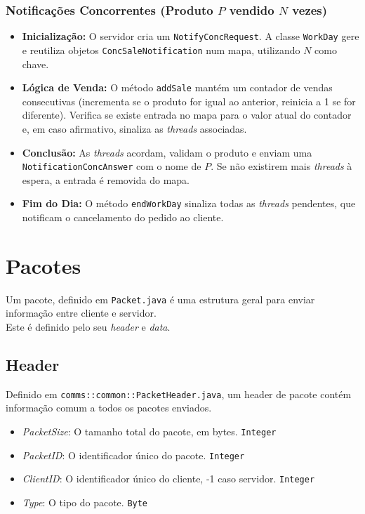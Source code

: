 \documentclass[runningheads]{llncs}
\begin{document}
\subsubsection{Notificações Concorrentes (Produto $P$ vendido $N$ vezes)}

\begin{itemize}
    \item \textbf{Inicialização:} O servidor cria um \texttt{NotifyConcRequest}. A classe \texttt{WorkDay} gere e reutiliza objetos \texttt{ConcSaleNotification} num mapa, utilizando $N$ como chave.
    
    \item \textbf{Lógica de Venda:} O método \texttt{addSale} mantém um contador de vendas consecutivas (incrementa se o produto for igual ao anterior, reinicia a 1 se for diferente). Verifica se existe entrada no mapa para o valor atual do contador e, em caso afirmativo, sinaliza as \textit{threads} associadas.
    
    \item \textbf{Conclusão:} As \textit{threads} acordam, validam o produto e enviam uma \texttt{NotificationConcAnswer} com o nome de $P$. Se não existirem mais \textit{threads} à espera, a entrada é removida do mapa.
    
    \item \textbf{Fim do Dia:} O método \texttt{endWorkDay} sinaliza todas as \textit{threads} pendentes, que notificam o cancelamento do pedido ao cliente.
\end{itemize}


\section{Pacotes}
Um pacote, definido em \texttt{Packet.java} é uma estrutura geral para enviar informação entre cliente e servidor.
\\ Este é definido pelo seu \emph{header} e \emph{data}.

\subsection{Header}
Definido em \texttt{comms::common::PacketHeader.java}, um header de pacote contém informação comum a todos os pacotes enviados.

\begin{itemize}
  \item \emph{PacketSize}: O tamanho total do pacote, em bytes. \texttt{Integer}
  \item \emph{PacketID}: O identificador único do pacote. \texttt{Integer}
  \item \emph{ClientID}: O identificador único do cliente, -1 caso servidor. \texttt{Integer}
  \item \emph{Type}: O tipo do pacote. \texttt{Byte}
\end{itemize}
\end{document}
